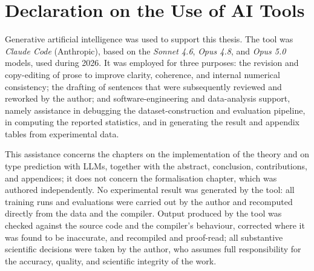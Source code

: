 \section*{Declaration on the Use of AI Tools}
Generative artificial intelligence was used to support this thesis. 
The tool was \emph{Claude Code} (Anthropic), based on the \emph{Sonnet 4.6}, \emph{Opus 4.8}, and \emph{Opus 5.0} models, used during 2026.
It was employed for three purposes: the revision and copy-editing of prose to improve clarity, coherence, and internal numerical consistency; the drafting of sentences that were subsequently reviewed and reworked by the author; and software-engineering and data-analysis support, namely assistance in debugging the dataset-construction and evaluation pipeline, in computing the reported statistics, and in generating the result and appendix tables from experimental data.

This assistance concerns the chapters on the implementation of the theory and on type prediction with LLMs, together with the abstract, conclusion, contributions, and appendices; it does not concern the formalisation chapter, which was authored independently. 
No experimental result was generated by the tool: all training runs and evaluations were carried out by the author and recomputed directly from the data and the compiler. 
Output produced by the tool was checked against the source code and the compiler's behaviour, corrected where it was found to be inaccurate, and recompiled and proof-read; all substantive scientific decisions were taken by the author, who assumes full responsibility for the accuracy, quality, and scientific integrity of the work.
